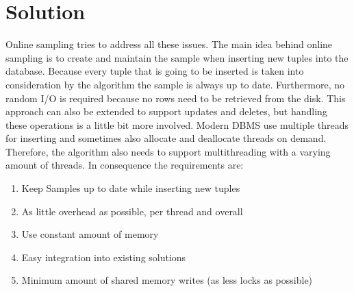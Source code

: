 \documentclass[sigconf,nonacm]{acmart}
\begin{document}
    \section{Solution}
        Online sampling tries to address all these issues. The main idea behind online sampling is to create and maintain the sample when inserting new tuples into the database. Because every tuple that is going to be inserted is taken into consideration by the algorithm the sample is always up to date. Furthermore, no random I/O is required because no rows need to be retrieved from the disk. This approach can also be extended to support updates and deletes, but handling these operations is a little bit more involved. Modern DBMS use multiple threads for inserting and sometimes also allocate and deallocate threads on demand. Therefore, the algorithm also needs to support multithreading with a varying amount of threads.
        In consequence the requirements are:
        \begin{enumerate}
            \item Keep Samples up to date while inserting new tuples
            \item As little overhead as possible, per thread and overall
            \item Use constant amount of memory
            \item Easy integration into existing solutions
            \item Minimum amount of shared memory writes (as less locks as possible)
        \end{enumerate}
        
\end{document}
